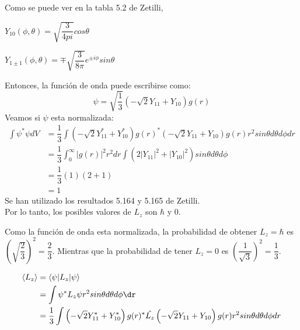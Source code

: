 \begin{solution}
  \begin{parts}
	\item Como se puede ver en la tabla 5.2 de Zetilli,
	\begin{itemize*}
	    \item[] $Y_{10}(\phi,\theta)=\sqrt{\dfrac{3}{4 pi}} cos \theta$
	    \item[] $Y_{1 \pm 1}(\phi,\theta)=\mp \sqrt{\dfrac{3}{8 \pi}}e^{\pm i \phi} sin \theta$
	\end{itemize*}
	Entonces, la funci\'{o}n de onda puede escribirse como:
 \begin{equation*}
     \psi=\sqrt{\dfrac{1}{3}} \left( -\sqrt{2} Y_{11} + Y_{10}\right)g(r)
 \end{equation*}
	Veamos si $\psi$ esta normalizada:
\begin{equation*}
\begin{aligned}
 \int \psi^{*} \psi dV&=\dfrac{1}{3}\int \left( -\sqrt{2}Y_{11}^{*} + Y_{10}^{*}\right)g(r)^{*} \left( -\sqrt{2} Y_{11}+Y_{10}\right)g(r) r^2 sin \theta d \theta d\phi dr \\
 &= \dfrac{1}{3}\int_0 ^{\infty} |g(r)|^2 r^2 dr \int \left( 2|Y_{11}|^2 + |Y_{10}|^2  \right)sin \theta d\theta d\phi\\
 &=\dfrac{1}{3} \left( 1\right) \left(2+1\right)\\
 &=1
 \end{aligned}\label{Norm}
\end{equation*}
Se han utilizado los resultados 5.164 y 5.165 de Zetilli.
\\
Por lo tanto, los posibles valores de $L_z$ son $\hbar$ y $0$.

\item Como la funci\'{o}n de onda  esta normalizada, la probabilidad de obtener $L_z=\hbar$ es $\left(\sqrt{\dfrac{2}{3}}\right)^2=\dfrac{2}{3}$. Mientras que la probabilidad de tener $L_z=0$ es $\left(\dfrac{1}{\sqrt{3}}\right)^2=\dfrac{1}{3}$.

\item 
\begin{equation*}
\begin{aligned}
 \langle L_z \rangle &=\langle \psi| L_z |\psi \rangle \\
 &= \int \psi^{*} L_z \psi r^2 sin \theta d \theta d\phi \dr\\
 &=\dfrac{1}{3}\int \left( -\sqrt{2}Y_{11}^{*} + Y_{10}^{*}\right)g(r)^{*} \hat{L_z} \left( -\sqrt{2} Y_{11}+Y_{10}\right)g(r) r^2 sin \theta d \theta d\phi dr\\
\end{aligned}\label{Norm}
\end{equation*}


\end{parts}
\end{solution}
